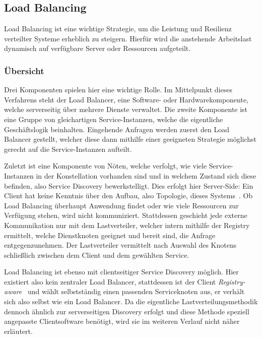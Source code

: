 \subsection{Load Balancing}
Load Balancing ist eine wichtige Strategie, um die Leistung und Resilienz verteilter Systeme erheblich zu steigern. Hierfür wird die anstehende Arbeitslast dynamisch auf verfügbare Server oder Ressourcen aufgeteilt.

\subsubsection{Übersicht}
Drei Komponenten spielen hier eine wichtige Rolle. Im Mittelpunkt dieses Verfahrens steht der Load Balancer, eine Software- oder Hardwarekomponente, welche serverseitig über mehrere Dienste verwaltet. Die zweite Komponente ist eine Gruppe von gleichartigen Service-Instanzen, welche die eigentliche Geschäftslogik beinhalten. Eingehende Anfragen werden zuerst den Load Balancer gestellt, welcher diese dann mithilfe einer geeigneten Strategie möglichst gerecht auf die Service-Instanzen aufteilt.

Zuletzt ist eine Komponente von Nöten, welche verfolgt, wie viele Service-Instanzen in der Konstellation vorhanden sind und in welchem Zustand sich diese befinden, also Service Discovery bewerkstelligt. Dies erfolgt hier Server-Side: Ein Client hat keine Kenntnis über den Aufbau, also Topologie, dieses Systems~\cite{schoner2017analyse}. Ob Load Balancing überhaupt Anwendung findet oder wie viele Ressourcen zur Verfügung stehen, wird nicht kommuniziert. Stattdessen geschieht jede externe Kommunikation nur mit dem Lastverteiler, welcher intern mithilfe der Registry ermittelt, welche Dienstknoten geeignet und bereit sind, die Anfrage entgegenzunehmen. Der Lastverteiler vermittelt nach Auswahl des Knotens schließlich zwischen dem Client und dem gewählten Service.

Load Balancing ist ebenso mit clientseitiger Service Discovery möglich. Hier existiert also kein zentraler Load Balancer, stattdessen ist der Client \textit{Registry-aware}~\cite{schoner2017analyse} und wählt selbstständig einen passenden Serviceknoten aus, er verhält sich also selbst wie ein Load Balancer. Da die eigentliche Lastverteilungsmethodik dennoch ähnlich zur serverseitigen Discovery erfolgt und diese Methode speziell angepasste Clientsoftware benötigt, wird sie im weiteren Verlauf nicht näher erläutert.

